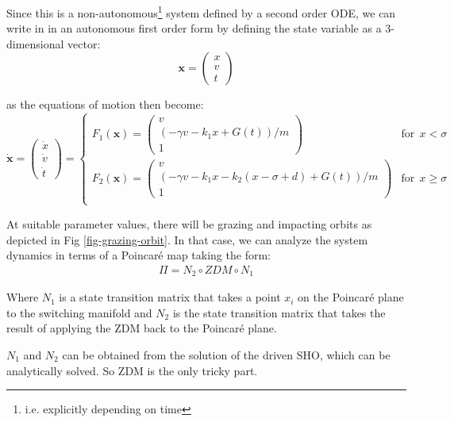 \documentclass[oneside]{book}
\renewcommand{\(}{\begin{columns}}
\renewcommand{\)}{\end{columns}}
\newcommand{\<}[1]{\begin{column}{#1}}
\renewcommand{\>}{\end{column}}
\newcommand{\mb}[1]{\mathbf{#1}}
\begin{document}
Since this is a non-autonomous\footnote{i.e. explicitly depending on time} 
system defined by a second order ODE, we can write in in an autonomous first 
order form by 
defining the state variable as a 3-dimensional vector:
\begin{equation}
\label{def-statevec}
\mb{x}=
\begin{pmatrix}
x\\
v\\
t
\end{pmatrix}
\end{equation}

as the equations of motion then become:
\begin{equation}
\label{eq-softimp-3d}
\dot{\mb{x}}=
\begin{pmatrix}
\dot{x}\\
\dot{v}\\
\dot{t}
\end{pmatrix}
=
\begin{cases}
F_1(\mb{x})=
\begin{pmatrix}
v\\
(-\gamma v-k_1x+G(t))/m\\
1
\end{pmatrix}&\mathrm{for}~~x<\sigma\\
F_2(\mb{x})=
\begin{pmatrix}
v\\
(-\gamma v-k_1x-k_2(x-\sigma+d)+G(t))/m\\
1
\end{pmatrix}&\mathrm{for}~~x\geq\sigma\\
\end{cases}
\end{equation}

At suitable parameter values, there will be grazing and impacting orbits as 
depicted in Fig \ref{fig-grazing-orbit}. In that case, we can analyze the system 
dynamics in terms of a Poincaré map taking the form:
\begin{align}
\label{eq-pmap-composed}
\Pi=N_2\circ ZDM\circ N_1
\end{align}

Where $N_1$ is a state transition matrix that takes a point $x_i$ on the 
Poincaré plane to the switching manifold and $N_2$ is the state transition 
matrix that takes  the result of applying the ZDM back to the Poincaré plane.  

$N_1$ and $N_2$ can be obtained from the solution of the driven SHO, which can 
be analytically solved.  So ZDM is the only tricky part. 
\end{document}

